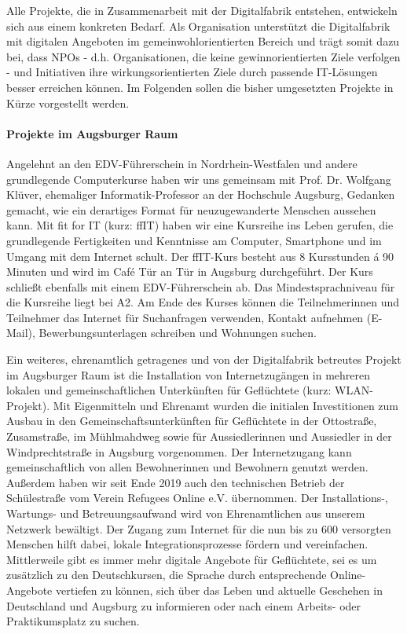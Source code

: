 \documentclass[12pt, a4paper]{article} %
\begin{document}
Alle Projekte, die in Zusammenarbeit mit der Digitalfabrik entstehen,
entwickeln sich aus einem konkreten Bedarf. Als Organisation unterstützt
die Digitalfabrik mit digitalen Angeboten im gemeinwohlorientierten
Bereich und trägt somit dazu bei, dass NPOs - d.h. Organisationen, die
keine gewinnorientierten Ziele verfolgen - und Initiativen ihre
wirkungsorientierten Ziele durch passende IT-Lösungen besser erreichen
können. Im Folgenden sollen die bisher umgesetzten Projekte in Kürze
vorgestellt werden.

\hypertarget{projekte-im-augsburger-raum}{%
\paragraph{\texorpdfstring{Projekte im Augsburger Raum
}{Projekte im Augsburger Raum }}\label{projekte-im-augsburger-raum}}

Angelehnt an den EDV-Führerschein in Nordrhein-Westfalen und andere
grundlegende Computerkurse haben wir uns gemeinsam mit Prof. Dr.
Wolfgang Klüver, ehemaliger Informatik-Professor an der Hochschule
Augsburg, Gedanken gemacht, wie ein derartiges Format für
neuzugewanderte Menschen aussehen kann. Mit fit for IT (kurz: ffIT)
haben wir eine Kursreihe ins Leben gerufen, die grundlegende
Fertigkeiten und Kenntnisse am Computer, Smartphone und im Umgang mit
dem Internet schult. Der ffIT-Kurs besteht aus 8 Kursstunden á 90
Minuten und wird im Café Tür an Tür in Augsburg durchgeführt. Der Kurs
schließt ebenfalls mit einem EDV-Führerschein ab. Das
Mindestsprachniveau für die Kursreihe liegt bei A2. Am Ende des Kurses
können die Teilnehmerinnen und Teilnehmer das Internet für Suchanfragen
verwenden, Kontakt aufnehmen (E-Mail), Bewerbungsunterlagen schreiben
und Wohnungen suchen.

Ein weiteres, ehrenamtlich getragenes und von der Digitalfabrik
betreutes Projekt im Augsburger Raum ist die Installation von
Internetzugängen in mehreren lokalen und gemeinschaftlichen Unterkünften
für Geflüchtete (kurz: WLAN-Projekt). Mit Eigenmitteln und Ehrenamt
wurden die initialen Investitionen zum Ausbau in den
Gemeinschaftsunterkünften für Geflüchtete in der Ottostraße,
Zusamstraße, im Mühlmahdweg sowie für Aussiedlerinnen und Aussiedler in
der Windprechtstraße in Augsburg vorgenommen. Der Internetzugang kann
gemeinschaftlich von allen Bewohnerinnen und Bewohnern genutzt werden.
Außerdem haben wir seit Ende 2019 auch den technischen Betrieb der
Schülestraße vom Verein Refugees Online e.V. übernommen. Der
Installations-, Wartungs- und Betreuungsaufwand wird von Ehrenamtlichen
aus unserem Netzwerk bewältigt. Der Zugang zum Internet für die nun bis
zu 600 versorgten Menschen hilft dabei, lokale Integrationsprozesse
fördern und vereinfachen. Mittlerweile gibt es immer mehr digitale
Angebote für Geflüchtete, sei es um zusätzlich zu den Deutschkursen, die
Sprache durch entsprechende Online-Angebote vertiefen zu können, sich
über das Leben und aktuelle Geschehen in Deutschland und Augsburg zu
informieren oder nach einem Arbeits- oder Praktikumsplatz zu suchen.
\end{document}
